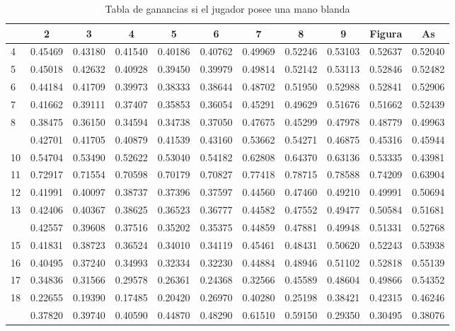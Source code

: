 \documentclass[12pt,a4paper,]{book}
\numberwithin{dummy}{section}
\theoremstyle{ocrenumbox}
\theoremstyle{blacknumex}
\theoremstyle{blacknumbox}
\theoremstyle{ocrenum}
\theoremstyle{ocrenum}
\begin{document}
\begin{longtable}[t]{lcccccccccc}
\caption{\label{tab:unnamed-chunk-6}Tabla de ganancias si el jugador posee una mano blanda}\\
\toprule
 & 2 & 3 & 4 & 5 & 6 & 7 & 8 & 9 & Figura & As\\
\midrule
4 & 0.45469 & 0.43180 & 0.41540 & 0.40186 & 0.40762 & 0.49969 & 0.52246 & 0.53103 & 0.52637 & 0.52040\\
5 & 0.45018 & 0.42632 & 0.40928 & 0.39450 & 0.39979 & 0.49814 & 0.52142 & 0.53113 & 0.52846 & 0.52482\\
6 & 0.44184 & 0.41709 & 0.39973 & 0.38333 & 0.38644 & 0.48702 & 0.51950 & 0.52988 & 0.52841 & 0.52906\\
7 & 0.41662 & 0.39111 & 0.37407 & 0.35853 & 0.36054 & 0.45291 & 0.49629 & 0.51676 & 0.51662 & 0.52439\\
8 & 0.38475 & 0.36150 & 0.34594 & 0.34738 & 0.37050 & 0.47675 & 0.45299 & 0.47978 & 0.48779 & 0.49963\\
\addlinespace
9 & 0.42701 & 0.41705 & 0.40879 & 0.41539 & 0.43160 & 0.53662 & 0.54271 & 0.46875 & 0.45316 & 0.45944\\
10 & 0.54704 & 0.53490 & 0.52622 & 0.53040 & 0.54182 & 0.62808 & 0.64370 & 0.63136 & 0.53335 & 0.43981\\
11 & 0.72917 & 0.71554 & 0.70598 & 0.70179 & 0.70827 & 0.77418 & 0.78715 & 0.78588 & 0.74209 & 0.63904\\
12 & 0.41991 & 0.40097 & 0.38737 & 0.37396 & 0.37597 & 0.44560 & 0.47460 & 0.49210 & 0.49991 & 0.50694\\
13 & 0.42406 & 0.40367 & 0.38625 & 0.36523 & 0.36777 & 0.44582 & 0.47552 & 0.49477 & 0.50584 & 0.51681\\
\addlinespace
14 & 0.42557 & 0.39608 & 0.37516 & 0.35202 & 0.35375 & 0.44859 & 0.47881 & 0.49948 & 0.51331 & 0.52768\\
15 & 0.41831 & 0.38723 & 0.36524 & 0.34010 & 0.34119 & 0.45461 & 0.48431 & 0.50620 & 0.52243 & 0.53938\\
16 & 0.40495 & 0.37240 & 0.34993 & 0.32334 & 0.32230 & 0.44884 & 0.48946 & 0.51102 & 0.52818 & 0.55139\\
17 & 0.34836 & 0.31566 & 0.29578 & 0.26361 & 0.24368 & 0.32566 & 0.45589 & 0.48604 & 0.49866 & 0.54352\\
18 & 0.22655 & 0.19390 & 0.17485 & 0.20420 & 0.26970 & 0.40280 & 0.25198 & 0.38421 & 0.42315 & 0.46246\\
\addlinespace
19 & 0.37820 & 0.39740 & 0.40590 & 0.44870 & 0.48290 & 0.61510 & 0.59150 & 0.29350 & 0.30495 & 0.38076\\

\end{longtable}
\end{document}
